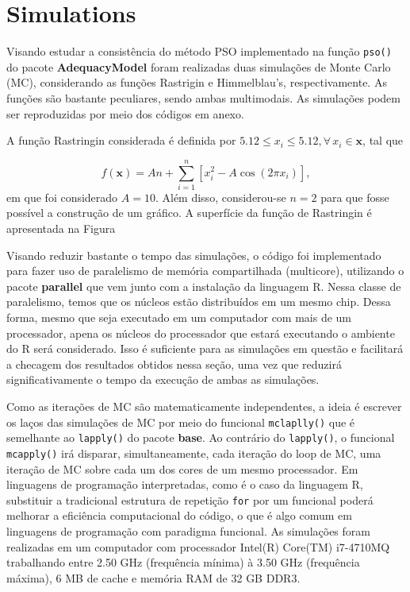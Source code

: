 \documentclass[10pt,letterpaper]{article}
\begin{document}
\section{Simulations}
Visando estudar a consistência do método PSO implementado na função \texttt{pso()} do pacote \textbf{AdequacyModel} foram realizadas duas simulações de Monte Carlo (MC), considerando as funções Rastrigin e Himmelblau's, respectivamente. As funções são bastante peculiares, sendo ambas multimodais. As simulações podem ser reproduzidas por meio dos códigos em anexo. 

A função Rastringin considerada é definida por $5.12 \leq x_i \leq 5.12, \forall\, x_i \in \bm{x}$, tal que

\begin{equation}
f(\bm{x}) = An + \sum_{i = 1}^{n} [x_i^2 - A\cos(2\pi x_i) ],
\end{equation}
em que foi considerado $A = 10$. Além disso, considerou-se $n = 2$ para que fosse possível a construção de um gráfico. A superfície da função de Rastringin 
é apresentada na Figura 
 
Visando reduzir bastante o tempo das simulações, o código foi implementado para fazer uso de paralelismo de memória compartilhada (multicore), utilizando o pacote \textbf{parallel} que vem junto com a instalação da linguagem \textsc{R}. Nessa classe de paralelismo, temos que os núcleos estão distribuídos em um mesmo chip. Dessa forma, mesmo que seja executado em um computador com mais de um processador, apena os núcleos do processador que estará executando o ambiente do \textsc{R} será considerado. Isso é suficiente para as simulações em questão e facilitará a checagem dos resultados obtidos nessa seção, uma vez que reduzirá significativamente o tempo da execução de ambas as simulações.
 
Como as iterações de MC são matematicamente independentes, a ideia é escrever os laços das simulações de MC por meio do funcional \texttt{mclaplly()} que é semelhante ao \texttt{lapply()} do pacote \textbf{base}. Ao contrário do \texttt{lapply()}, o funcional \texttt{mcapply()} irá disparar, simultaneamente, cada iteração do loop de MC, uma iteração de MC sobre cada um dos cores de um mesmo processador.  Em linguagens de programação interpretadas, como é o caso da linguagem \textsc{R}, substituir a tradicional estrutura de repetição \texttt{for} por um funcional poderá melhorar a eficiência computacional do código, o que é algo comum em linguagens de programação com paradigma funcional.
As simulações foram realizadas em um computador com processador Intel(R) Core(TM) i7-4710MQ trabalhando entre 2.50 GHz (frequência mínima) à 3.50 GHz (frequência máxima), 6 MB de cache e memória RAM de 32 GB DDR3.
\end{document}
